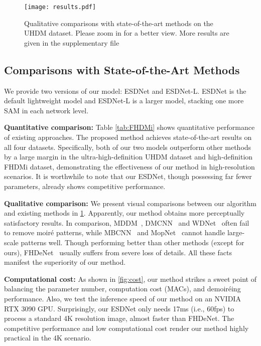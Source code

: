 \documentclass[runningheads]{llncs}
\newcommand{\ie}{i.e.}
\begin{document}
\begin{figure}[t]\centering
\texttt{[image: results.pdf]}

\caption{Qualitative comparisons with state-of-the-art methods on the UHDM dataset. Please zoom in for a better view. More results are given in the supplementary file}
\label{fig:visual} 
\end{figure}



\subsection{Comparisons with State-of-the-Art Methods}
We provide two versions of our model: ESDNet and ESDNet-L.
ESDNet is the default lightweight model and ESDNet-L is a larger model, stacking one more SAM in each network level.

\noindent\textbf{Quantitative comparison:}
Table \ref{tab:FHDMi} shows quantitative performance of existing approaches. The proposed method achieves state-of-the-art results on all four datasets. Specifically, both of our two models outperform other methods by a large margin in the ultra-high-definition  UHDM dataset and high-definition FHDMi dataset, demonstrating the effectiveness of our method in high-resolution scenarios. It is worthwhile to note that our ESDNet, though possessing far fewer parameters, already shows competitive performance.

\noindent\textbf{Qualitative comparison:}
We present visual comparisons between our algorithm and existing methods in \cref{fig:visual}. Apparently, our method obtains more perceptually satisfactory results. In comparison, MDDM~\cite{cheng2019multi}, DMCNN~\cite{sun2018moire} and WDNet~\cite{liu2020wavelet} often fail to remove moiré patterns, while MBCNN~\cite{zheng2020image} and MopNet~\cite{he2019mop} cannot handle large-scale patterns well. Though 
performing better than other methods (except for ours), FHDeNet~\cite{he2020fhde}  usually suffers from severe loss of details. All these facts manifest the superiority of our method.

\noindent\textbf{Computational cost:} As shown in \cref{fig:cost}, our method strikes a sweet point of balancing the parameter number, computation cost (MACs), and demoiréing performance. Also, we test the inference speed of our method on an NVIDIA RTX 3090 GPU. Surprisingly, our ESDNet only needs 17ms (\ie, 60fps) to process a standard 4K resolution image, almost  faster than FHDeNet. The competitive performance and low computational cost render our method highly practical in the 4K scenario.
\end{document}
